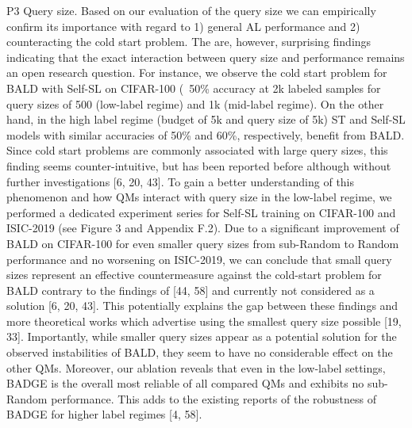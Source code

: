 \documentclass[]{article}
\begin{document}
P3 Query size. Based on our evaluation of the query size we can empirically confirm its importance
with regard to 1) general AL performance and 2) counteracting the cold start problem. The are,
however, surprising findings indicating that the exact interaction between query size and performance
remains an open research question. For instance, we observe the cold start problem for BALD with
Self-SL on CIFAR-100 (~50\% accuracy at 2k labeled samples for query sizes of 500 (low-label
regime) and 1k (mid-label regime). On the other hand, in the high label regime (budget of 5k and
query size of 5k) ST and Self-SL models with similar accuracies of 50\% and 60\%, respectively,
benefit from BALD. Since cold start problems are commonly associated with large query sizes, this
finding seems counter-intuitive, but has been reported before although without further investigations
[6, 20, 43]. To gain a better understanding of this phenomenon and how QMs interact with query
size in the low-label regime, we performed a dedicated experiment series for Self-SL training on
CIFAR-100 and ISIC-2019 (see Figure 3 and Appendix F.2). Due to a significant improvement
of BALD on CIFAR-100 for even smaller query sizes from sub-Random to Random performance
and no worsening on ISIC-2019, we can conclude that small query sizes represent an effective
countermeasure against the cold-start problem for BALD contrary to the findings of [44, 58] and
currently not considered as a solution [6, 20, 43]. This potentially explains the gap between these
findings and more theoretical works which advertise using the smallest query size possible [19, 33].
Importantly, while smaller query sizes appear as a potential solution for the observed instabilities of
BALD, they seem to have no considerable effect on the other QMs. Moreover, our ablation reveals
that even in the low-label settings, BADGE is the overall most reliable of all compared QMs and
exhibits no sub-Random performance. This adds to the existing reports of the robustness of BADGE
for higher label regimes [4, 58].
\end{document}
